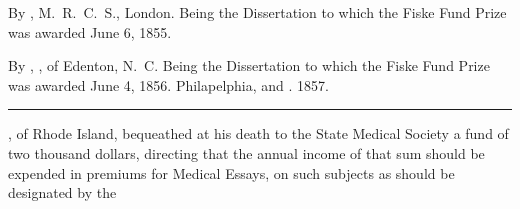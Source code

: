 \footnotesize
{}  By , M.~R.~C.~S., London. Being the Dissertation to which the Fiske Fund Prize was awarded June 6, 1855.

  By , \md, of Edenton, N.~C. Being the Dissertation to which the Fiske Fund Prize was awarded June 4, 1856. Philapelphia,  and . 1857.
\plainbreak{1}

\normalsize

, of Rhode Island, bequeathed at his death to the
State Medical Society a fund of two thousand dollars, directing that
the annual income of that sum should be expended in premiums for
Medical Essays, on such subjects as should be designated by the\endinput
